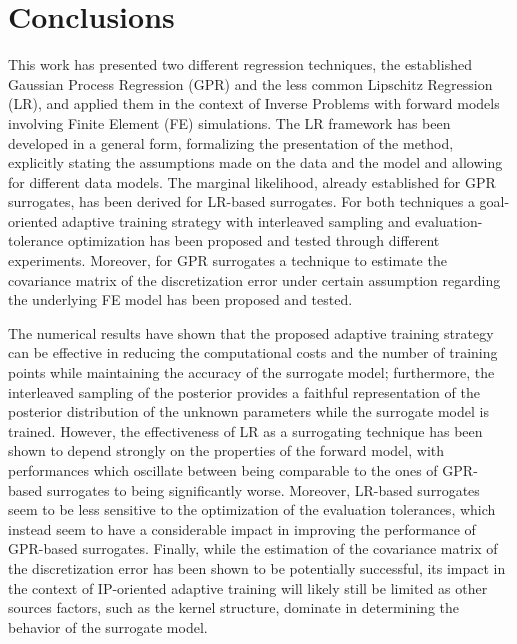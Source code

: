 \section{Conclusions}\label{sec:conclusions}
This work has presented two different regression techniques, the established Gaussian Process Regression (GPR) and the less common Lipschitz Regression (LR), and applied them in the context of Inverse Problems with forward models involving Finite Element (FE) simulations. 
The LR framework has been developed in a general form, formalizing the presentation of the method, explicitly stating the assumptions made on the data and the model and allowing for different data models.
The marginal likelihood, already established for GPR surrogates, has been derived for LR-based surrogates.
For both techniques a goal-oriented adaptive training strategy with interleaved sampling and evaluation-tolerance optimization has been proposed and tested through different experiments.
Moreover, for GPR surrogates a technique to estimate the covariance matrix of the discretization error under certain assumption regarding the underlying FE model has been proposed and tested. \medskip

The numerical results have shown that the proposed adaptive training strategy can be effective in reducing the computational costs and the number of training points while maintaining the accuracy of the surrogate model; furthermore, the interleaved sampling of the posterior provides a faithful representation of the posterior distribution of the unknown parameters while the surrogate model is trained.
However, the effectiveness of LR as a surrogating technique has been shown to depend strongly on the properties of the forward model, with performances which oscillate between being comparable to the ones of GPR-based surrogates to being significantly worse.
Moreover, LR-based surrogates seem to be less sensitive to the optimization of the evaluation tolerances, which instead seem to have a considerable impact in improving the performance of GPR-based surrogates.
Finally, while the estimation of the covariance matrix of the discretization error has been shown to be potentially successful, its impact in the context of IP-oriented adaptive training will likely still be limited as other sources factors, such as the kernel structure, dominate in determining the behavior of the surrogate model.\medskip

